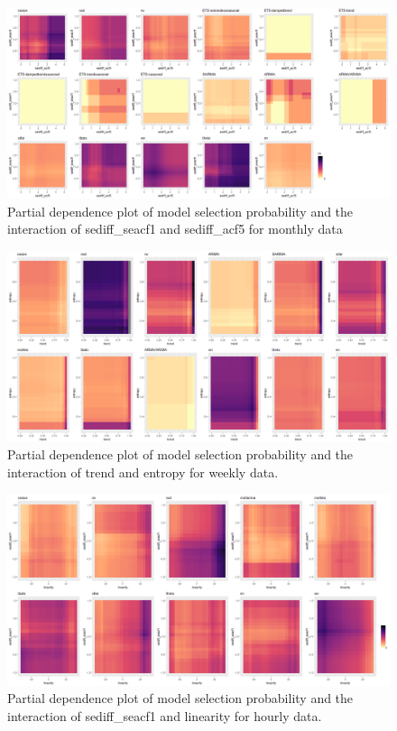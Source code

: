 \documentclass[11pt,a4paper,]{article}
\begin{document}
\begin{figure}
\centering
\includegraphics{figures/mtwopdp-1.png}
\caption{\label{fig:mtwopdp}Partial dependence plot of model selection
probability and the interaction of sediff\_seacf1 and sediff\_acf5 for
monthly data}
\end{figure}

\begin{figure}
\centering
\includegraphics{figures/wtwopdp-1.png}
\caption{\label{fig:wtwopdp}Partial dependence plot of model selection
probability and the interaction of trend and entropy for weekly data.}
\end{figure}

\begin{figure}
\centering
\includegraphics{figures/htwopdp-1.png}
\caption{\label{fig:htwopdp}Partial dependence plot of model selection
probability and the interaction of sediff\_seacf1 and linearity for
hourly data.}
\end{figure}

\newpage

\printbibliography[title=References]
\end{document}
